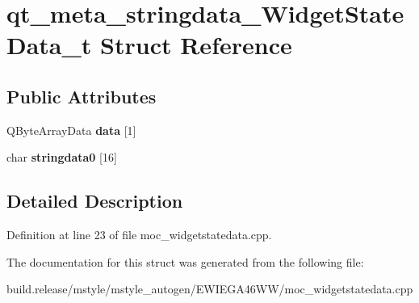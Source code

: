 \hypertarget{structqt__meta__stringdata___widget_state_data__t}{}\section{qt\+\_\+meta\+\_\+stringdata\+\_\+\+Widget\+State\+Data\+\_\+t Struct Reference}
\label{structqt__meta__stringdata___widget_state_data__t}
\subsection*{Public Attributes}
\begin{DoxyCompactItemize}
\item 
\mbox{\label{structqt__meta__stringdata___widget_state_data__t_a8cce37a164b7302914212aa87ca78033}} 
Q\+Byte\+Array\+Data {\bfseries data} \mbox{[}1\mbox{]}
\item 
\mbox{\label{structqt__meta__stringdata___widget_state_data__t_a946d5a196f8027107a5d0189ef1ce488}} 
char {\bfseries stringdata0} \mbox{[}16\mbox{]}
\end{DoxyCompactItemize}


\subsection{Detailed Description}


Definition at line 23 of file moc\+\_\+widgetstatedata.\+cpp.



The documentation for this struct was generated from the following file\+:\begin{DoxyCompactItemize}
\item 
build.\+release/mstyle/mstyle\+\_\+autogen/\+E\+W\+I\+E\+G\+A46\+W\+W/moc\+\_\+widgetstatedata.\+cpp\end{DoxyCompactItemize}
